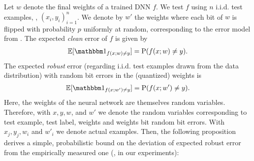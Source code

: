Let $w$ denote the final weights of a trained DNN $f$. We test $f$ using $n$ i.i.d. test examples, \ie, $(x_i,y_i)_{i=1}^n$. We denote by $w'$ the weights where each bit of $w$ is flipped with probability $p$ uniformly at random, corresponding to the error model from .
The expected \emph{clean} error  of $f$ is given by
\begin{align*}
	\Exp[\Id_{f(x;w)\neq y}] = \Pr(f(x;w)\neq y).
\end{align*}
The expected \emph{robust} error (regarding i.i.d. test examples drawn from the data distribution) with random bit errors in the (quantized) weights is
\begin{align*}
	\Exp[ \Id_{f(x;w')\neq y}] = \Pr( f(x;w')\neq y).
\end{align*}
Here, the weights of the neural network are themselves random variables. Therefore, with $x, y, w$, and $w'$ we denote the random variables corresponding to test example, test label, weights and weights bit random bit errors. With $x_j, y_j, w_i$ and $w'_i$ we denote actual examples. Then, the following proposition derives a simple, probabilistic bound on the deviation of expected robust error from the empirically measured one (\ie, \RTE in our experiments):

